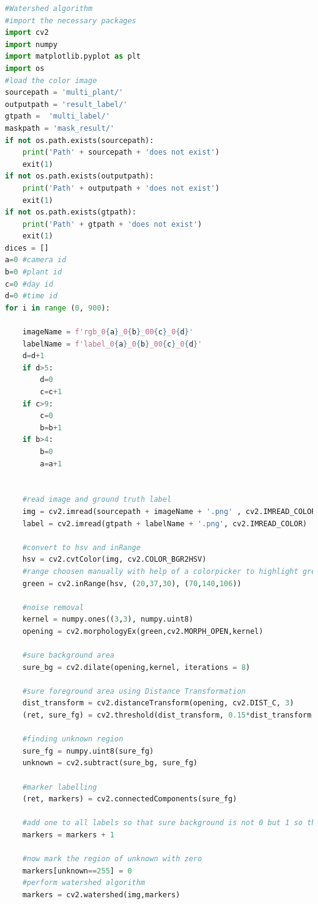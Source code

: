 \documentclass[10pt]{article}
\begin{document}
\begin{lstlisting}[language=Python]
#Watershed algorithm
#import the necessary packages
import cv2
import numpy
import matplotlib.pyplot as plt
import os
#load the color image 
sourcepath = 'multi_plant/'
outputpath = 'result_label/'
gtpath =  'multi_label/'
maskpath = 'mask_result/'
if not os.path.exists(sourcepath):
    print('Path' + sourcepath + 'does not exist')
    exit(1)
if not os.path.exists(outputpath):
    print('Path' + outputpath + 'does not exist')
    exit(1)
if not os.path.exists(gtpath):
    print('Path' + gtpath + 'does not exist')
    exit(1)
dices = []
a=0 #camera id
b=0 #plant id
c=0 #day id
d=0 #time id
for i in range (0, 900):

    imageName = f'rgb_0{a}_0{b}_00{c}_0{d}'
    labelName = f'label_0{a}_0{b}_00{c}_0{d}'
    d=d+1
    if d>5:
        d=0
        c=c+1
    if c>9:
        c=0
        b=b+1
    if b>4:
        b=0
        a=a+1     


    #read image and ground truth label
    img = cv2.imread(sourcepath + imageName + '.png' , cv2.IMREAD_COLOR)
    label = cv2.imread(gtpath + labelName + '.png', cv2.IMREAD_COLOR)
    
    #convert to hsv and inRange
    hsv = cv2.cvtColor(img, cv2.COLOR_BGR2HSV)
    #range choosen manually with help of a colorpicker to highlight green color
    green = cv2.inRange(hsv, (20,37,30), (70,140,106))

    #noise removal
    kernel = numpy.ones((3,3), numpy.uint8)
    opening = cv2.morphologyEx(green,cv2.MORPH_OPEN,kernel)

    #sure background area
    sure_bg = cv2.dilate(opening,kernel, iterations = 8)

    #sure foreground area using Distance Transformation
    dist_transform = cv2.distanceTransform(opening, cv2.DIST_C, 3)
    (ret, sure_fg) = cv2.threshold(dist_transform, 0.15*dist_transform.max(), 255, 0)

    #finding unknown region
    sure_fg = numpy.uint8(sure_fg)
    unknown = cv2.subtract(sure_bg, sure_fg)

    #marker labelling
    (ret, markers) = cv2.connectedComponents(sure_fg)

    #add one to all labels so that sure background is not 0 but 1 so that watershed algorithm won't consider it as unknown area
    markers = markers + 1

    #now mark the region of unknown with zero
    markers[unknown==255] = 0
    #perform watershed algorithm
    markers = cv2.watershed(img,markers)
    

\end{lstlisting}
\end{document}
